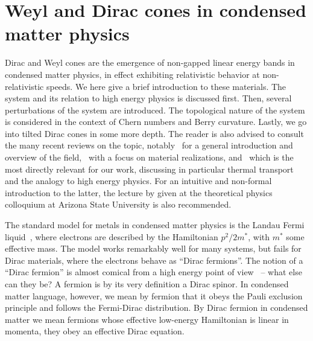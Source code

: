 \section[Weyl and Dirac cones]{Weyl and Dirac cones in condensed matter physics}
\label{sec:weyl-dirac-cones}
Dirac and Weyl cones are the emergence of non-gapped linear energy bands in condensed matter physics, in effect exhibiting relativistic behavior at non-relativistic speeds.
We here give a brief introduction to these materials.
The system and its relation to high energy physics is discussed first.
Then, several perturbations of the system are introduced.
The topological nature of the system is considered in the context of Chern numbers and Berry curvature.
Lastly, we go into tilted Dirac cones in some more depth.
The reader is also advised to consult the many recent reviews on the topic, notably~\textcite{armitageWeylDiracSemimetals2018} for a general introduction and overview of the field,~\textcite{jiaWeylSemimetalsFermi2016} with a focus on material realizations, and~\textcite{chernodubThermalTransportGeometry2021} which is the most directly relevant for our work, discussing in particular thermal transport and the analogy to high energy physics.
For an intuitive and non-formal introduction to the latter, the lecture by \textcite{vozmedianoTheoreticalPhysicsColloquium2021} given at the theoretical physics colloquium at Arizona State University is also recommended.


The standard model for metals in condensed matter physics is the Landau Fermi liquid~\cites{landauTheoryFermiLiquid1956,chernodubThermalTransportGeometry2021}, where electrons are described by the Hamiltonian \( p^2 /2 m^* \), with \( m^* \) some effective mass.
The model works remarkably well for many systems, but fails for Dirac materials, where the electrons behave as ``Dirac fermions''.
The notion of a ``Dirac fermion'' is almost comical from a high energy point of view~\cites{chernodubThermalTransportGeometry2021,vozmedianoTheoreticalPhysicsColloquium2021} -- what else can they be?
A fermion is by its very definition a Dirac spinor.
In condensed matter language, however, we mean by fermion that it obeys the Pauli exclusion principle and follows the Fermi-Dirac distribution.
By Dirac fermion in condensed matter we mean fermions whose effective low-energy Hamiltonian is linear in momenta, they obey an effective Dirac equation.


